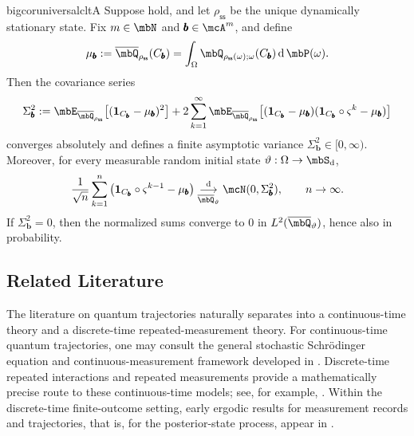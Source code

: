 \documentclass[a4paper]{article}
\numberwithin{equation}{section}   %
\theoremstyle{plain}   %
\theoremstyle{plain}   %
\theoremstyle{examplestyle}
\DeclareMathOperator{\states}{\mbS_d}   %
\DeclareMathOperator{\pr}{\mbP}           %
\newcommand{\s}{\rho_{\mathsf{ss}}}     %
\newcommand{\dee}{\mathrm{d}}           %
\begin{document}
    \begin{restatable}{bigcor}{universalcltA}
    \label{thm:universal-clt-A}
        Suppose  hold, and let \(\s\) be the unique dynamically stationary state. Fix \(m\in\mbN\) and \(\pmb b\in\mcA^m\), and define
        \[
            \mu_{\pmb b}
            :=
            \overline{\mbQ}_{\s}(C_{\pmb b})
            =
            \int_\Omega \mbQ_{\s(\omega);\omega}(C_{\pmb b})\,\dee\pr(\omega).
        \]
        Then the covariance series
        \[
            \Sigma_{\pmb b}^2
            :=
            \mbE_{\overline\mbQ_{\s}}\!\left[(\mathbf 1_{C_{\pmb b}}-\mu_{\pmb b})^2\right]
            +
            2\sum_{k=1}^\infty
            \mbE_{\overline\mbQ_{\s}}\!\left[
                (\mathbf 1_{C_{\pmb b}}-\mu_{\pmb b})
                ( \mathbf 1_{C_{\pmb b}}\circ\varsigma^{k} -\mu_{\pmb b})
            \right]
        \]
        converges absolutely and defines a finite asymptotic variance \(\Sigma_{\pmb b}^2\in[0,\infty)\). 
        Moreover, for every measurable random initial state \(\vartheta:\Omega\to\states\),
        \[
            \frac{1}{\sqrt n}\sum_{k=1}^n
            \left(\mathbf 1_{C_{\pmb b}}\circ\varsigma^{k-1} -\mu_{\pmb b}\right)
            \underset{\overline\mbQ_{\vartheta}}{\overset{\mathrm d}{\longrightarrow}}
            \mcN(0,\Sigma_{\pmb b}^2),
            \qquad n\to\infty.
        \]
        If \(\Sigma_{\pmb b}^2=0\), then the normalized sums converge to \(0\) in \(L^2(\overline\mbQ_{\vartheta})\), hence also in probability.
    \end{restatable}


\subsection{Related Literature}
\label{section:lit}


    The literature on quantum trajectories naturally separates into a continuous-time theory and a discrete-time repeated-measurement theory. 
    For continuous-time quantum trajectories, one may consult the general stochastic Schr\"odinger equation and continuous-measurement framework developed in \cite{Dav76,Gis84,Car93,Hol01,BGM04,BG09,WM09}. 
    Discrete-time repeated interactions and repeated measurements provide a mathematically precise route to these continuous-time models; see, for example, \cite{AP06,Pel08,BBB13,NP09}. 
    Within the discrete-time finite-outcome setting, early ergodic results for measurement records and trajectories, that is, for the posterior-state process, appear in \cite{kummerer2003ergodic,KM04}. 
    
\end{document}
